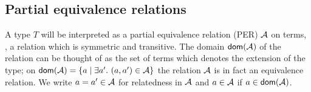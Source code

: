 \documentclass[acmsmall%
]{acmart}\settopmatter{printfolios=true}
\begin{document}



\subsection{Partial equivalence relations}
\label{sec:per}

A type $T$ will be interpreted as a partial equivalence relation (PER)
$\mathcal{A}$ on terms, \ie, a relation which is symmetric and transitive. The
domain $\mathop{\mathsf{dom}}\nolimits(\mathcal{A})$ of the relation can be thought of as the set of
terms which denotes the extension of the type; on
$\mathop{\mathsf{dom}}\nolimits(\mathcal{A}) = \{a \mid \exists a'.\ (a,a') \in \mathcal{A} \}$ the relation $\mathcal{A}$
is in fact an equivalence relation.  We write $a = a' \in \mathcal{A}$ for
relatedness in $\mathcal{A}$ and $a \in \mathcal{A}$ if $a \in \mathop{\mathsf{dom}}\nolimits(\mathcal{A})$.
\end{document}
